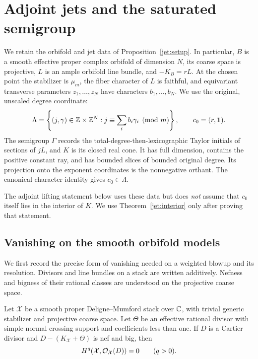\section{Adjoint jets and the saturated semigroup}
\label{adj:section}

We retain the orbifold and jet data of Proposition~\ref{jet:setup}.
In particular, $B$ is a smooth effective proper complex orbifold of
dimension $N$, its coarse space is projective, $L$ is an ample orbifold
line bundle, and $-K_B=rL$.  At the chosen point the stabilizer is
$\mu_m$, the fiber character of $L$ is faithful, and equivariant
transverse parameters $z_1,\ldots,z_N$ have characters
$b_1,\ldots,b_N$.  We use the original, unscaled degree coordinate:
\[
 \Lambda=\left\{(j,\gamma)\in\mathbb Z\times\mathbb Z^N:
       j\equiv\sum_i b_i\gamma_i\pmod m\right\},
 \qquad c_0=(r,\mathbf1).
\]
The semigroup $\Gamma$ records the total-degree-then-lexicographic
Taylor initials of sections of $jL$, and $K$ is its closed real cone.
It has full dimension, contains the positive constant ray, and has
bounded slices of bounded original degree.  Its projection onto the
exponent coordinates is the nonnegative orthant.  The canonical
character identity gives $c_0\in\Lambda$.

The adjoint lifting statement below uses these data but does \emph{not}
assume that $c_0$ itself lies in the interior of $K$.  We use
Theorem~\ref{jet:interior} only after proving that statement.

\subsection{Vanishing on the smooth orbifold models}

We first record the precise form of vanishing needed on a weighted
blowup and its resolution.  Divisors and line bundles on a stack are
written additively.  Nefness and bigness of their rational classes are
understood on the projective coarse space.

\begin{lemma}\label{adj:vanishing}
Let $\mathcal X$ be a smooth proper Deligne--Mumford stack over $\mathbb C$,
with trivial generic stabilizer and projective coarse space.  Let
$\Theta$ be an effective rational divisor with simple normal crossing
support and coefficients less than one.  If $D$ is a Cartier divisor
and $D-(K_{\mathcal X}+\Theta)$ is nef and big, then
\[
 H^q(\mathcal X,\mathcal O_{\mathcal X}(D))=0\qquad(q>0).
\]
\end{lemma}

